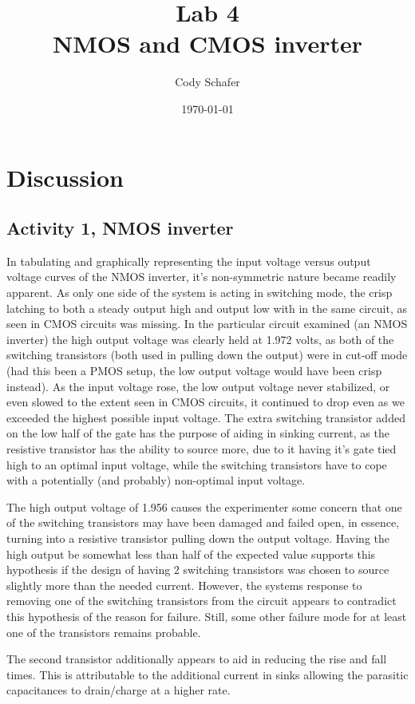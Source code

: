 \documentclass[10pt]{article}
\title{\textbf{Lab} 4 \\
NMOS and CMOS inverter}
\author{Cody Schafer}
\date{\today}
\begin{document}
\maketitle
\section{Discussion}

\subsection{Activity 1, NMOS inverter}

In tabulating and graphically representing the input voltage versus output
voltage curves of the NMOS inverter, it's non-symmetric nature became
readily apparent. As only one side of the system is acting in switching
mode, the crisp latching to both a steady output high and output low with
in the same circuit, as seen in CMOS circuits was missing. In the
particular circuit examined (an NMOS inverter) the high output voltage was
clearly held at 1.972 volts, as both of the switching transistors (both
used in pulling down the output) were in cut-off mode (had this been a
PMOS setup, the low output voltage would have been crisp instead). As the
input voltage rose, the low output voltage never stabilized, or even
slowed to the extent seen in CMOS circuits, it continued to drop even as
we exceeded the highest possible input voltage. The extra switching
transistor added on the low half of the gate has the purpose of aiding in
sinking current, as the resistive transistor has the ability to source
more, due to it having it's gate tied high to an optimal input voltage,
while the switching transistors have to cope with a potentially (and
probably) non-optimal input voltage.

The high output voltage of 1.956 causes the experimenter some concern that
one of the switching transistors may have been damaged and failed open, in
essence, turning into a resistive transistor pulling down the output
voltage. Having the high output be somewhat less than half of the expected
value supports this hypothesis if the design of having 2 switching
transistors was chosen to source slightly more than the needed current.
However, the systems response to removing one of the switching
transistors from the circuit appears to contradict this hypothesis of the
reason for failure. Still, some other failure mode for at least one of the
transistors remains probable.

The second transistor additionally appears to aid in reducing the rise and
fall times. This is attributable to the additional current in sinks
allowing the parasitic capacitances to drain/charge at a higher rate.
\end{document}

